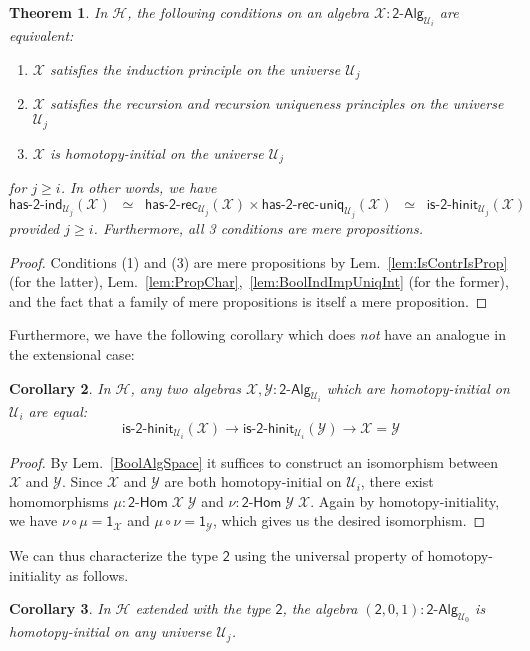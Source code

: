 \documentclass[reqno,10pt,a4paper,oneside]{amsart}
\newcommand{\X}{\mathcal{X}}
\newcommand{\Y}{\mathcal{Y}}
\newcommand{\comp}{\circ}
\newcommand{\Bool}{\mathsf{2}}
\newcommand{\one}{\mathsf{1}}
\newcommand{\UU}{\mathcal{U}}
\newcommand{\BoolAlg}{\mathsf{2}\text{-}\mathsf{Alg}}
\newcommand{\BoolHom}{\mathsf{2}\text{-}\mathsf{Hom}}
\newcommand{\HasBoolRec}{\mathsf{has}\text{-}\mathsf{2}\text{-}\mathsf{rec}}
\newcommand{\HasBoolInd}{\mathsf{has}\text{-}\mathsf{2}\text{-}\mathsf{ind}}
\newcommand{\HasBoolRecUniq}{\mathsf{has}\text{-}\mathsf{2}\text{-}\mathsf{rec}\text{-}\mathsf{uniq}}
\newcommand{\IsBoolHInit}{\mathsf{is}\text{-}\mathsf{2}\text{-}\mathsf{hinit}}
\newcommand{\Hint}{\mathcal{H}}
\numberwithin{equation}{section}
\theoremstyle{mythm}
\newtheorem{theorem}{Theorem}[section]
\newtheorem{corollary}[theorem]{Corollary}
\theoremstyle{mydef}
\theoremstyle{myrmk}
\begin{document}
\begin{theorem}\label{lem:BoolMainInt}
In $\Hint$, the following conditions on an algebra $\X : \BoolAlg_{\UU_i}$ are equivalent:
\begin{enumerate}
\item $\X$ satisfies the induction principle on the universe $\UU_j$
\item $\X$ satisfies the recursion and recursion uniqueness principles on the universe $\UU_j$
\item $\X$ is homotopy-initial on the universe $\UU_j$  
\end{enumerate}
for $j \geq i$. In other words, we have \[ \HasBoolInd_{\UU_j}(\X)  \;\; \simeq \;\; \HasBoolRec_{\UU_j}(\X) \times \HasBoolRecUniq_{\UU_j}(\X) \;\; \simeq \;\; \IsBoolHInit_{\UU_j}(\X) \]
provided $j \geq i$. Furthermore, all 3 conditions are mere propositions.
\end{theorem}
\begin{proof}
Conditions (1) and (3) are mere propositions by Lem.~\ref{lem:IsContrIsProp} (for the latter), Lem.~\ref{lem:PropChar},~\ref{lem:BoolIndImpUniqInt} (for the former), and the fact that a family of mere propositions is itself a mere proposition.
\end{proof}

Furthermore, we have the following corollary which does \emph{not} have an analogue in the extensional case:
\begin{corollary}\label{BoolHInitIso}
In $\Hint$, any two algebras $\X,\Y : \BoolAlg_{\UU_i}$ which are homotopy-initial on $\UU_i$ are equal:
\[ \IsBoolHInit_{\UU_i}(\X) \to \IsBoolHInit_{\UU_i}(\Y) \to \X = \Y\] 
\end{corollary}
\begin{proof}
By Lem.~\ref{BoolAlgSpace} it suffices to construct an isomorphism between $\X$ and $\Y$. Since $\X$ and $\Y$ are both homotopy-initial on $\UU_i$, there exist homomorphisms $\mu : \BoolHom \; \X \; \Y$ and $\nu : \BoolHom \; \Y \; \X$. Again by homotopy-initiality, we have $\nu \comp \mu = \one_\X$ and $\mu \comp \nu = \one_\Y$, which gives us the desired isomorphism.
\end{proof}

We can thus characterize the type $\Bool$ using the universal property of homotopy-initiality as follows.
\begin{corollary}\label{lem:BoolInitInt}
In $\Hint$ extended with the type $\Bool$, the algebra $(\Bool,0,1) : \BoolAlg_{\UU_0}$ is homotopy-initial on any universe $\UU_j$.
\end{corollary}
\end{document}
